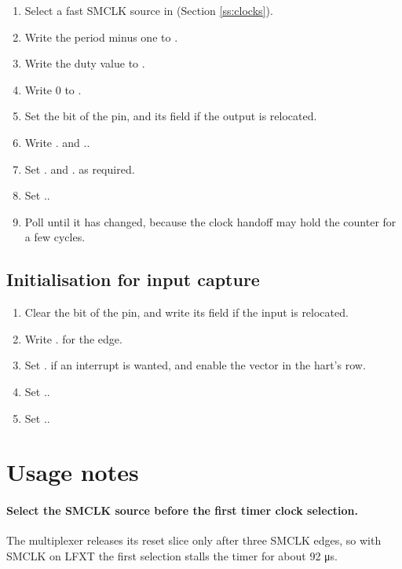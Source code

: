 \begin{enumerate}
	\item Select a fast SMCLK source in  (Section \ref{ss:clocks}).
	\item Write the period minus one to .
	\item Write the duty value to .
	\item Write 0 to .
	\item Set the  bit of the  pin, and its  field if the output is relocated.
	\item Write . and ..
	\item Set . and . as required.
	\item Set ..
	\item Poll  until it has changed, because the clock handoff may hold the counter for a few cycles.
\end{enumerate}

\subsection{Initialisation for input capture}

\begin{enumerate}
	\item Clear the  bit of the  pin, and write its  field if the input is relocated.
	\item Write . for the edge.
	\item Set . if an interrupt is wanted, and enable the vector in the hart's  row.
	\item Set ..
	\item Set ..
\end{enumerate}

\section{Usage notes}

\paragraph{Select the SMCLK source before the first timer clock selection.} The multiplexer releases its reset slice only after three SMCLK edges, so with SMCLK on LFXT the first selection stalls the timer for about 92 \si{\micro\second}.

